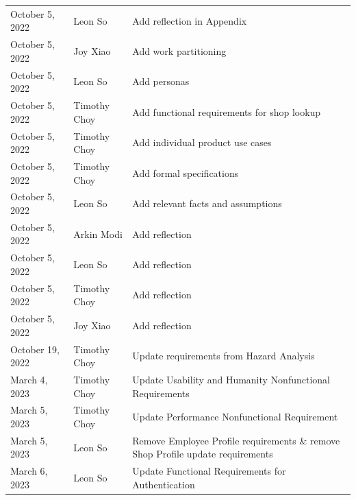 \documentclass[12pt]{article}
\begin{document}
\begin{longtable}{p{} p{} p{}}
	October 5, 2022    & Leon So               & Add reflection in Appendix                                                         \\
	October 5, 2022    & Joy Xiao              & Add work partitioning                                                              \\
	October 5, 2022    & Leon So               & Add personas                                                                       \\
	October 5, 2022    & Timothy Choy          & Add functional requirements for shop lookup                                        \\
	October 5, 2022    & Timothy Choy          & Add individual product use cases                                                   \\
	October 5, 2022    & Timothy Choy          & Add formal specifications                                                          \\
	October 5, 2022    & Leon So               & Add relevant facts and assumptions                                                 \\
	October 5, 2022    & Arkin Modi            & Add reflection                                                                     \\
	October 5, 2022    & Leon So               & Add reflection                                                                     \\
	October 5, 2022    & Timothy Choy          & Add reflection                                                                     \\
	October 5, 2022    & Joy Xiao              & Add reflection                                                                     \\
	October 19, 2022   & Timothy Choy          & Update requirements from Hazard Analysis                                           \\
	March 4, 2023      & Timothy Choy          & Update Usability and Humanity Nonfunctional Requirements                           \\
	March 5, 2023      & Timothy Choy          & Update Performance Nonfunctional Requirement                                       \\
	March 5, 2023      & Leon So               & Remove Employee Profile requirements \& remove Shop Profile update requirements    \\
	March 6, 2023      & Leon So               & Update Functional Requirements for Authentication                                  \\

\end{longtable}
\end{document}
